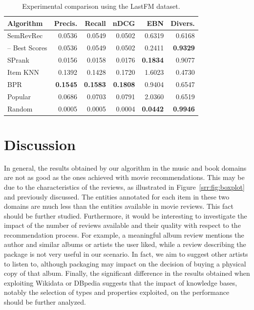 \begin{table}
\centering
\begin{tabular}{@{}lrrrrr@{}}
\toprule
Algorithm & Precis. & Recall & nDCG   & EBN    & Divers. \\ \midrule
SemRevRec & 0.0536  & 0.0549 & 0.0502 & 0.6319 & 0.6168 \\
-- Best Scores & 0.0536  & 0.0549 & 0.0502 & 0.2411 & \textbf{0.9329} \\ \midrule
SPrank    & 0.0156  & 0.0158 & 0.0176 & \textbf{0.1834} & 0.9077 \\
Item KNN  & 0.1392  & 0.1428 & 0.1720 & 1.6023 & 0.4730 \\
BPR       & \textbf{0.1545}  & \textbf{0.1583} & \textbf{0.1808} & 0.9404 & 0.6547 \\
Popular   & 0.0686  & 0.0703 & 0.0791 & 2.0360 & 0.6519 \\
Random    & 0.0005  & 0.0005 & 0.0004 & \textbf{0.0442} & \textbf{0.9946} \\ \bottomrule
\end{tabular}
\caption[Comparison using the LastFM dataset]{Experimental comparison using the LastFM dataset.}
\label{srr:tab:ex2-fm}
\end{table}

\section{Discussion}
\label{srr:sec:discussion}

In general, the results obtained by our algorithm in the music and book domains are not as good as the ones achieved with movie recommendations. This may be due to the characteristics of the reviews, as illustrated in Figure~\ref{srr:fig:boxplot} and previously discussed. The entities annotated for each item in these two domains are much less than the entities available in movie reviews. This fact should be further studied. Furthermore, it would be interesting to investigate the impact of the number of reviews available and their quality with respect to the recommendation process. For example, a meaningful album review mentions the author and similar albums or artists the user liked, while a review describing the package is not very useful in our scenario. In fact, we aim to suggest other artists to listen to, although packaging may impact on the decision of buying a physical copy of that album. Finally, the significant difference in the results obtained when exploiting Wikidata or DBpedia suggests that the impact of knowledge bases, notably the selection of types and properties exploited, on the performance should be further analyzed.

